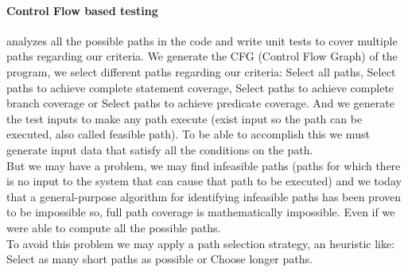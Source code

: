 \documentclass{llncs}
\begin{document}
\paragraph{Control Flow based testing} analyzes all the possible paths in the code and write unit tests to cover multiple paths regarding our criteria.
We generate the CFG (Control Flow Graph) of the program, we select different paths regarding our criteria:
Select all paths, Select paths to achieve complete statement coverage\cite{stt,Ntafos:1988:CST:630792.631017},
Select paths to achieve complete branch coverage\cite{Roper1994,stt}
or Select paths to achieve predicate coverage\cite{stt,Ntafos:1988:CST:630792.631017}.
And we generate the test inputs to make any path execute (exist input so the path can be executed, also called feasible path).
To be able to accomplish this we must generate input data that satisfy all the conditions on the path.\\
But we may have a problem, we may find infeasible paths (paths for which there is no input to the system that can cause that path to be executed)
and we today that a general-purpose algorithm for identifying infeasible paths has been proven to be impossible\cite{infeasible} so, full path coverage
is mathematically impossible. Even if we were able to compute all the possible paths.\\
To avoid this problem we may apply a path selection strategy, an heuristic like: Select as many short paths as possible or Choose longer paths.

\end{document}
